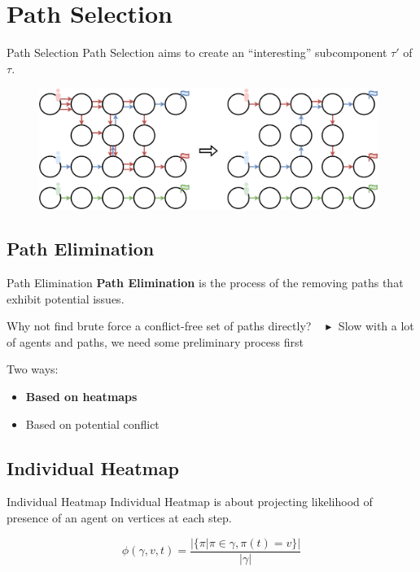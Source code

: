 \section{Path Selection}
\begin{frame}{Path Selection}
    Path Selection aims to create an ``interesting'' subcomponent \(\tau'\) of \(\tau\). 

    \begin{figure}[H]
        \centering
        \includegraphics[width=11cm]{img/pm_example_intro.png}
    \end{figure}

\end{frame}


\subsection{Path Elimination}
\begin{frame}{Path Elimination}
    \textbf{  Path Elimination} is the process of the removing paths that exhibit potential issues. 
    
    \begin{block}{Why not find brute force a conflict-free set of paths directly?}
        \(\text{    }\blacktriangleright\) Slow with a lot of agents and paths, we need some preliminary process first
    \end{block}

    Two ways:
    \begin{itemize}
        \item \textbf{Based on heatmaps}
        \item Based on potential conflict
    \end{itemize}

\end{frame}


\subsection{Individual Heatmap}
\begin{frame}[fragile]{Individual Heatmap}
    Individual Heatmap is about projecting likelihood of presence of an agent on vertices
at each step.

    \[
        \phi(\gamma,v,t) = \frac{| \{\pi|\pi \in \gamma,\pi(t) = v\}|}{|\gamma|}
    \]


\end{frame}

